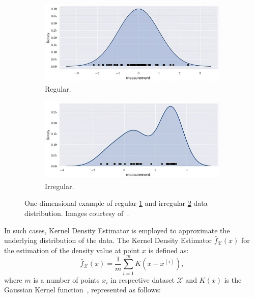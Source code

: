\documentclass{ctuthesis}
\begin{document}
\begin{figure}[!ht]
  \centering 
  \begin{subfigure}[b]{1\textwidth}
      \includegraphics[width=\textwidth]{figChap4/regular-transformed.jpeg}
      \caption{Regular.}
      \label{fig:reg}
  \end{subfigure}  
  \begin{subfigure}[b]{1\textwidth}
      \includegraphics[width=\textwidth]{figChap4/irregular-transformed.jpeg}
      \caption{Irregular.}
      \label{fig:irreg}
  \end{subfigure}
  \caption{One-dimensional example of regular \ref{fig:reg} and irregular \ref{fig:irreg} 
  data distribution.
  Images courtesy of~\cite{Jaroslaw2023KDEexplain}.}
  \label{fig:DataDistribution}
\end{figure}
In such cases, 
Kernel Density Estimator is employed to approximate the underlying distribution of the data. 
The Kernel Density Estimator \( \hat{f}_\mathcal{X}(x) \) 
for the estimation of the density value at point \( x \) is defined as:
\[ \hat{f}_\mathcal{X}(x) = \frac{1}{m} \sum_{i=1}^{m} K \left( x - x^{(i)} \right), \]
where $m$ is a number of points $x_i$ in respective dataset $\mathcal{X}$ and
\( K(x) \) is the Gaussian Kernel function~\cite{Jaroslaw2023KDEmultidimensional}, represented as follows:
\end{document}
